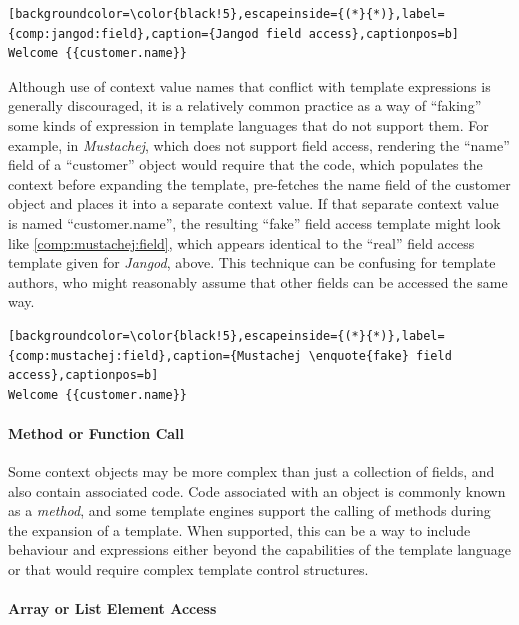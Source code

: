 \begin{lstlisting}[backgroundcolor=\color{black!5},escapeinside={(*}{*)},label={comp:jangod:field},caption={Jangod field access},captionpos=b]
Welcome {{customer.name}}
\end{lstlisting}

\label{A184}
Although use of context value names that conflict with template expressions is generally discouraged, it is a relatively common practice as a way of \enquote{faking} some kinds of expression in \gls{template language}s that do not support them. For example, in \emph{Mustachej}, which does not support field access, rendering the \enquote{name} field of a \enquote{customer} object would require that the code, which populates the context before expanding the template, pre-fetches the name field of the customer object and places it into a separate context value. If that separate context value is named \enquote{customer.name}, the resulting \enquote{fake} field access template might look like \autoref{comp:mustachej:field}, which appears identical to the \enquote{real} field access template given for \emph{Jangod}, above. This technique can be confusing for template authors, who might reasonably assume that other fields can be accessed the same way.

\begin{lstlisting}[backgroundcolor=\color{black!5},escapeinside={(*}{*)},label={comp:mustachej:field},caption={Mustachej \enquote{fake} field access},captionpos=b]
Welcome {{customer.name}}
\end{lstlisting}

\paragraph{Method or Function Call}

Some context objects may be more complex than just a collection of fields, and also contain associated code. Code associated with an object is commonly known as a \emph{method}, and some \gls{template engine}s support the calling of methods during the expansion of a template. When supported, this can be a way to include behaviour and expressions either beyond the capabilities of the \gls{template language} or that would require complex template control structures.

\paragraph{Array or List Element Access}

